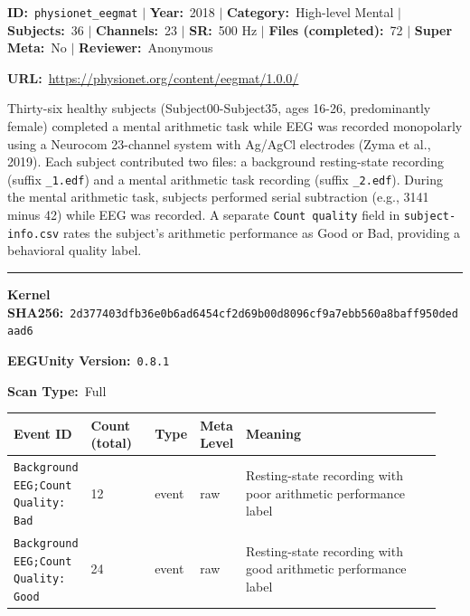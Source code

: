 {\begin{tcolorbox}
{\footnotesize \textbf{ID:}~\texttt{physionet\_eegmat} $\mid$ \textbf{Year:}~2018 $\mid$ \textbf{Category:}~High-level Mental $\mid$ \textbf{Subjects:}~36 $\mid$ \textbf{Channels:}~23 $\mid$ \textbf{SR:}~500 Hz $\mid$ \textbf{Files (completed):}~72 $\mid$ \textbf{Super Meta:}~No $\mid$ \textbf{Reviewer:}~Anonymous}
\par{\footnotesize\textbf{URL:}~\url{https://physionet.org/content/eegmat/1.0.0/}}
\tcbline
{}\par\smallskip
{\footnotesize Thirty-six healthy subjects (Subject00-Subject35, ages 16-26, predominantly female) completed a mental arithmetic task while EEG was recorded monopolarly using a Neurocom 23-channel system with Ag/AgCl electrodes (Zyma et al., 2019). Each subject contributed two files: a background resting-state recording (suffix \texttt{\_1.edf}) and a mental arithmetic task recording (suffix \texttt{\_2.edf}). During the mental arithmetic task, subjects performed serial subtraction (e.g., 3141 minus 42) while EEG was recorded. A separate \texttt{Count quality} field in \texttt{subject-info.csv} rates the subject's arithmetic performance as Good or Bad, providing a behavioral quality label.}
\noindent\rule{\linewidth}{0.4pt}\par\nopagebreak
{}\par\smallskip
{\scriptsize
\noindent\textbf{Kernel SHA256:}~\texttt{2d377403dfb36e0b6ad6454cf2d69b00d8096cf9a7ebb560a8baff950dedaad6}\par\smallskip
\noindent\textbf{EEGUnity Version:}~\texttt{0.8.1}\par\smallskip
\noindent\textbf{Scan Type:}~Full\par\smallskip
}
\smallskip{}\par\smallskip
\begingroup\scriptsize\setlength{\tabcolsep}{2pt}
\begin{tabular}{@{}p{0.1567\linewidth}p{0.1567\linewidth}p{0.0783\linewidth}p{0.0783\linewidth}p{0.4700\linewidth}@{}}
\toprule
\textbf{Event ID} & \textbf{Count (total)} & \textbf{Type} & \textbf{Meta Level} & \textbf{Meaning} \\
\midrule
\texttt{Background EEG;Count Quality: Bad} & 12 & event & raw & Resting-state recording with poor arithmetic performance label \\
\texttt{Background EEG;Count Quality: Good} & 24 & event & raw & Resting-state recording with good arithmetic performance label \\

\end{tabular}
\end{tcolorbox}}
